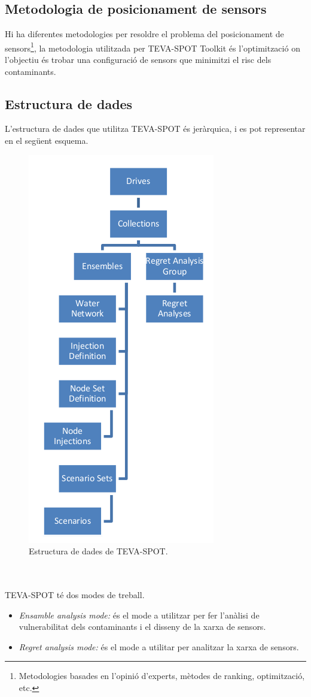 \documentclass[12pt]{article}
\begin{document}
\subsection{Metodologia de posicionament de sensors}
Hi ha diferentes metodologies per resoldre el problema del posicionament de sensors\footnote{Metodologies basades en l'opinió d'experts, mètodes de ranking, optimització, etc.}, la metodologia utilitzada per TEVA-SPOT Toolkit és l'optimització on l'objectiu és trobar una configuració de sensors que minimitzi el risc dels contaminants.

\subsection{Estructura de dades}
L'estructura de dades que utilitza TEVA-SPOT és jeràrquica, i es pot representar en el següent esquema.
\begin{figure}[h!]
	\centering
	\includegraphics[scale=.5]{imatges/teva-spot/esquema.png}
	\caption{Estructura de dades de TEVA-SPOT.}
\end{figure}
\\\\TEVA-SPOT té dos modes de treball.
\begin{itemize}
	\item \textit{Ensamble analysis mode:} és el mode a utilitzar per fer l'anàlisi de vulnerabilitat dels contaminants i el disseny de la xarxa de sensors.
	\item \textit{Regret analysis mode:} és el mode a utilitar per analitzar la xarxa de sensors. 
\end{itemize}
\end{document}
